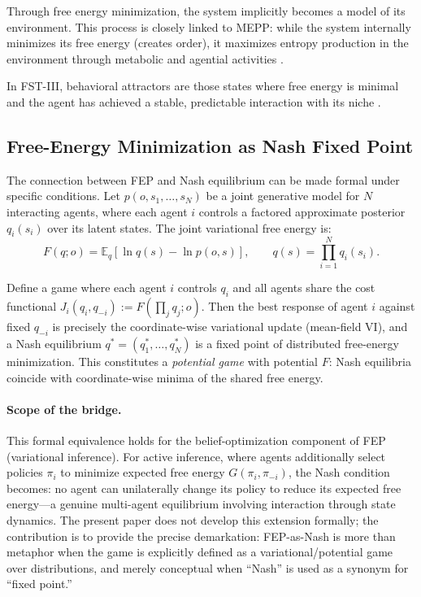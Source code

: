 \documentclass[12pt,a4paper]{article}
\theoremstyle{remark}
\begin{document}
Through free energy minimization, the system implicitly becomes a model of its environment. This process is closely linked to MEPP: while the system internally minimizes its free energy (creates order), it maximizes entropy production in the environment through metabolic and agential activities \citep{FristonPDF}.

In FST-III, behavioral attractors are those states where free energy is minimal and the agent has achieved a stable, predictable interaction with its niche \citep{FristonFreeEnergy}.

\subsection{Free-Energy Minimization as Nash Fixed Point}

The connection between FEP and Nash equilibrium can be made formal under specific conditions. Let $p(o,s_1,\dots,s_N)$ be a joint generative model for $N$ interacting agents, where each agent $i$ controls a factored approximate posterior $q_i(s_i)$ over its latent states. The joint variational free energy is:
\begin{equation}
F(q; o) = \mathbb{E}_q\!\left[\ln q(s) - \ln p(o, s)\right], \qquad q(s) = \prod_{i=1}^{N} q_i(s_i).
\end{equation}

Define a game where each agent $i$ controls $q_i$ and all agents share the cost functional $J_i(q_i, q_{-i}) := F(\prod_j q_j; o)$. Then the best response of agent $i$ against fixed $q_{-i}$ is precisely the coordinate-wise variational update (mean-field VI), and a Nash equilibrium $q^* = (q_1^*, \dots, q_N^*)$ is a fixed point of distributed free-energy minimization. This constitutes a \emph{potential game} with potential $F$: Nash equilibria coincide with coordinate-wise minima of the shared free energy.

\paragraph{Scope of the bridge.} This formal equivalence holds for the belief-optimization component of FEP (variational inference). For active inference, where agents additionally select policies $\pi_i$ to minimize expected free energy $G(\pi_i, \pi_{-i})$, the Nash condition becomes: no agent can unilaterally change its policy to reduce its expected free energy---a genuine multi-agent equilibrium involving interaction through state dynamics. The present paper does not develop this extension formally; the contribution is to provide the precise demarkation: FEP-as-Nash is more than metaphor when the game is explicitly defined as a variational/potential game over distributions, and merely conceptual when ``Nash'' is used as a synonym for ``fixed point.''
\end{document}
